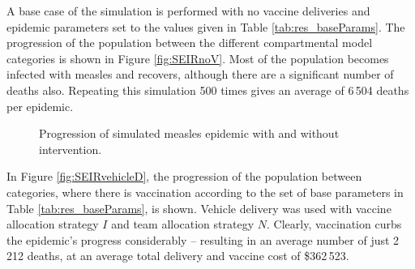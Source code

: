 A base case of the simulation is performed with no vaccine deliveries and epidemic parameters set to the values given in Table \ref{tab:res_baseParams}. 
The progression of the population between the different compartmental model categories is shown in Figure \ref{fig:SEIRnoV}. Most of the population becomes infected with measles and recovers, although there are a significant number of deaths also. Repeating this simulation 500 times gives an average of 6\,504 deaths per epidemic. 

\begin{figure}[ht]{\textwidth}
    \centering
    \caption{Progression of simulated measles epidemic with and without intervention.}
\end{figure}

In Figure \ref{fig:SEIRvehicleD}, the progression of the population between categories, where there is vaccination according to the set of base parameters in Table \ref{tab:res_baseParams}, is shown. Vehicle delivery was used with vaccine allocation strategy $I$ and team allocation strategy $N$. Clearly, vaccination curbs the epidemic's progress considerably -- resulting in an average number of just 2\,212 deaths, at an average total delivery and vaccine cost of \$362\,523.

